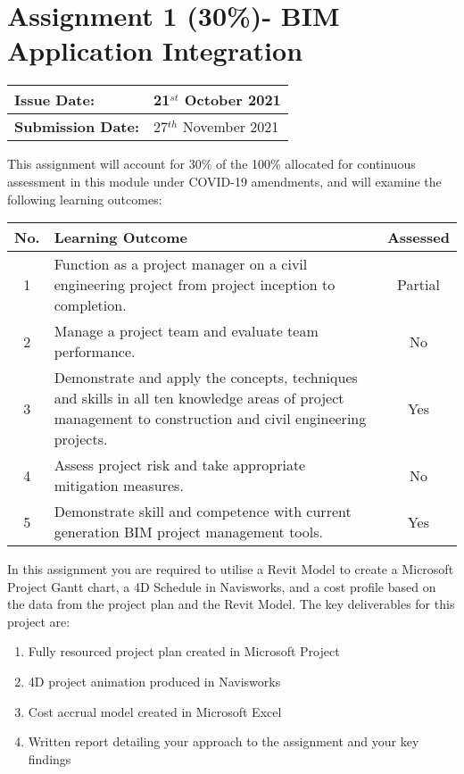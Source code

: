 
	

\part*{Assignment 1 (30\%)- BIM Application Integration}

\begin{tabularx}{\textwidth}{ |X|X| }
	\hline
	\textbf{Issue Date:} & 21$^{st}$ October 2021 \\
	\hline 
	\textbf{Submission Date:}  & 27$^{th}$ November 2021 \\
	\hline
\end{tabularx}

\vspace{.5cm}

This assignment will account for 30\% of the 100\% allocated for continuous assessment in this module under COVID-19 amendments, and will examine the following learning outcomes:\\

\begin{tabularx}{\textwidth}{ |c|X|c| }
	\hline
	\textbf{No.} & \textbf{Learning Outcome} & \textbf{Assessed} \\
	\hline 
	1  & Function as a project manager on a civil engineering project from project inception to completion. & Partial \\
	2  & Manage a project team and evaluate team performance. & No \\
	3  & Demonstrate and apply the concepts, techniques and skills in all ten knowledge areas of project management to construction and civil engineering projects. & Yes \\
	4  & Assess project risk and take appropriate mitigation measures. & No \\
	5  & Demonstrate skill and competence with current generation BIM project management tools. & Yes \\
	\hline
\end{tabularx}

\vspace{.5cm}

In this assignment you are required to utilise a Revit Model to create a Microsoft Project Gantt chart, a 4D Schedule in Navisworks, and a cost profile based on the data from the project plan and the Revit Model.  The key deliverables for this project are:

\begin{enumerate}
	\item Fully resourced project plan created in Microsoft Project
	\item 4D project animation produced in Navisworks
	\item Cost accrual model created in Microsoft Excel
	\item Written report detailing your approach to the assignment and your key findings
\end{enumerate}


